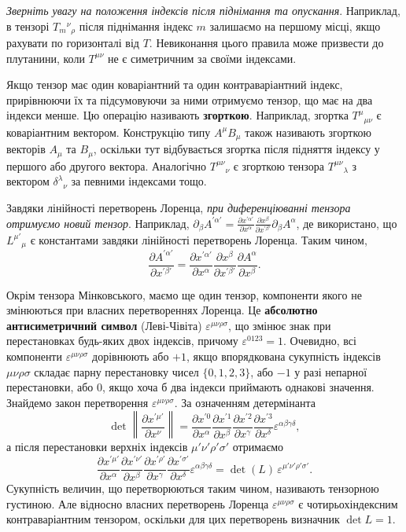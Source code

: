 \documentclass[%
biblatex,
]{ConspectBook}
\begin{document}
\textit{Зверніть увагу на положення індексів після піднімання та
опускання}. Наприклад, в тензорі $T_m{}^\nu{}_\rho$
після піднімання індекс $m$ залишаємо на першому місці, якщо рахувати по
горизонталі від $T$. Невиконання цього правила може призвести до плутанини,
коли $T^{\mu\nu}$ не є симетричним за своїми індексами.

Якщо тензор має один коваріантний та один контраваріантний індекс,
прирівнюючи їх та підсумовуючи за ними отримуємо тензор, що має на два
індекси менше. Цю операцію називають \textbf{згорткою}. Наприклад, згортка
$T^\mu{}_{\mu\nu}$ є коваріантним вектором.
Конструкцію типу $A^\mu B_\mu$ також називають згорткою векторів $A_\mu$ та
$B_\mu$, оскільки тут відбувається згортка після підняття індексу у першого
або другого вектора. Аналогічно $T^{\mu\nu}{}_\nu$ є згорткою тензора
$T^{\mu\nu}{}_\lambda$ з вектором $\delta^\lambda{}_\nu$ за певними індексами тощо.

Завдяки лінійності перетворень Лоренца, \textit{при диференціюванні
тензора отримуємо новий тензор}. Наприклад,
$\partial_\beta A^{\prime\alpha'} = \frac{\partial x^{\prime\alpha'}}{\partial x^\alpha}
\frac{\partial x^\beta}{\partial x^{\prime\beta'}} \partial_\beta A^\alpha$,
де використано, що $L^{\mu'}{}_\mu$ є константами завдяки лінійності
перетворень Лоренца. Таким чином,
\[
  \frac{\partial A^{\prime\alpha'}}{\partial x^{\prime\beta'}} =
  \frac{\partial x^{\prime\alpha'}}{\partial x^\alpha}
  \frac{\partial x^\beta}{\partial x^{\prime\beta'}}
  \frac{\partial A^\alpha}{\partial x^\beta}.
\]

Окрім тензора Мінковського, маємо ще один тензор, компоненти якого не
змінюються при власних перетвореннях Лоренца. Це \textbf{абсолютно
антисиметричний символ} (Леві-Чівіта) $\varepsilon^{\mu\nu\rho\sigma}$, що
змінює знак при перестановках будь-яких двох індексів, причому
$\varepsilon^{0123} = 1$.
Очевидно, всі компоненти $\varepsilon^{\mu\nu\rho\sigma}$ дорівнюють
або $+1$, якщо впорядкована сукупність індексів $\mu\nu\rho\sigma$ складає
парну перестановку чисел $\{0,1,2,3\}$, або $-1$ у разі непарної
перестановки, або $0$, якщо хоча б два індекси приймають однакові значення.
Знайдемо закон перетворення $\varepsilon^{\mu\nu\rho\sigma}$.
За означенням детермінанта
\[
  \det\left\|\frac{\partial x^{\prime\mu'}}{\partial x^\nu}\right\|
  = \frac{\partial x^{\prime 0}}{\partial x^\alpha}
    \frac{\partial x^{\prime 1}}{\partial x^\beta}
    \frac{\partial x^{\prime 2}}{\partial x^\gamma}
    \frac{\partial x^{\prime 3}}{\partial x^\delta}
    \varepsilon^{\alpha\beta\gamma\delta},
\]
а після перестановки верхніх індексів $\mu'\nu'\rho'\sigma'$ отримаємо
\[
  \frac{\partial x^{\prime\mu'}}{\partial x^\alpha}
  \frac{\partial x^{\prime\nu'}}{\partial x^\beta}
  \frac{\partial x^{\prime\rho'}}{\partial x^\gamma}
  \frac{\partial x^{\prime\sigma'}}{\partial x^\delta}
  \varepsilon^{\alpha\beta\gamma\delta}
  = \det(L)\,\varepsilon^{\mu'\nu'\rho'\sigma'}.
\]
Сукупність величин, що перетворюються таким чином, називають тензорною
густиною. Але відносно власних перетворень Лоренца $\varepsilon^{\mu\nu\rho\sigma}$
є чотирьохіндексним контраваріантним тензором, оскільки для цих перетворень
визначник $\det L = 1$.
\end{document}
